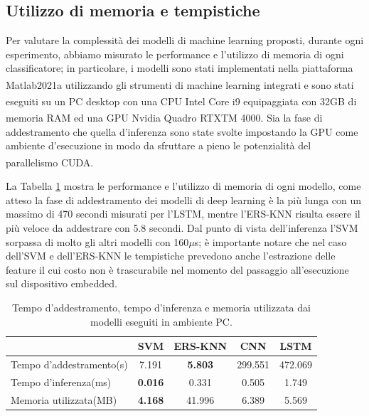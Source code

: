 \subsection{Utilizzo di memoria e tempistiche}
\label{ssec:utilizzo-di-memoria-e-tempistiche}

Per valutare la complessità dei modelli di machine learning proposti, durante ogni esperimento, abbiamo misurato le performance e l'utilizzo di memoria di ogni classificatore; in particolare, i modelli sono stati implementati nella piattaforma Matlab2021a\textsuperscript{\textregistered} utilizzando gli strumenti di machine learning integrati e sono stati eseguiti su un PC desktop con una CPU Intel\textsuperscript{\textregistered} Core i9 equipaggiata con 32GB di memoria RAM ed una GPU Nvidia\textsuperscript{\textregistered} Quadro\textsuperscript{\textregistered} RTXTM 4000. Sia la fase di addestramento che quella d'inferenza sono state svolte impostando la GPU come ambiente d'esecuzione in modo da sfruttare a pieno le potenzialità del parallelismo CUDA\textsuperscript{\textregistered}.

La Tabella \ref{tab:memory} mostra le performance e l'utilizzo di memoria di ogni modello, come atteso la fase di addestramento dei modelli di deep learning è la più lunga con un massimo di 470 secondi misurati per l'LSTM, mentre l'ERS-KNN risulta essere il più veloce da addestrare con 5.8 secondi. Dal punto di vista dell'inferenza l'SVM sorpassa di molto gli altri modelli con 160$\mu$s; è importante notare che nel caso dell'SVM e dell'ERS-KNN le tempistiche prevedono anche l'estrazione delle feature il cui costo non è trascurabile nel momento del passaggio all'esecuzione sul dispositivo embedded.

\begin{table}
    \centering
    \begin{tabular}{l c c c c}
        \hline
        & SVM & ERS-KNN & CNN & LSTM \\
        \hline
        Tempo d'addestramento(s) & 7.191 & \textbf{5.803} & 299.551  & 472.069 \\
        Tempo d'inferenza(ms) & \textbf{0.016} & 0.331 & 0.505  & 1.749 \\
        Memoria utilizzata(MB) & \textbf{4.168} & 41.996& 6.389 & 5.569 \\
        \hline
    \end{tabular}
    \caption{Tempo d'addestramento, tempo d'inferenza e memoria utilizzata dai modelli eseguiti in ambiente PC.}
    \label{tab:memory}
\end{table}

